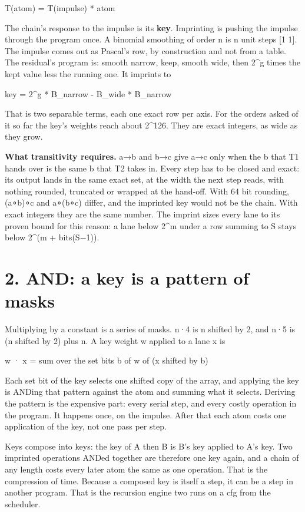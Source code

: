 T(atom) = T(impulse) * atom

The chain's response to the impulse is its \textbf{key}. Imprinting is pushing the impulse through the program once. A binomial smoothing of order n is n unit steps [1 1]. The impulse comes out as Pascal's row, by construction and not from a table. The residual's program is: smooth narrow, keep, smooth wide, then 2\textasciicircum{}g times the kept value less the running one. It imprints to

key = 2\textasciicircum{}g * B\_\allowbreak{}narrow  -  B\_\allowbreak{}wide * B\_\allowbreak{}narrow

That is two separable terms, each one exact row per axis. For the orders asked of it so far the key's weights reach about 2\textasciicircum{}126. They are exact integers, as wide as they grow.

\textbf{What transitivity requires.} a→b and b→c give a→c only when the b that T1 hands over is the same b that T2 takes in. Every step has to be closed and exact: its output lands in the same exact set, at the width the next step reads, with nothing rounded, truncated or wrapped at the hand-off. With 64 bit rounding, (a∘b)∘c and a∘(b∘c) differ, and the imprinted key would not be the chain. With exact integers they are the same number. The imprint sizes every lane to its proven bound for this reason: a lane below 2\textasciicircum{}m under a row summing to S stays below 2\textasciicircum{}(m + bits(S−1)).

\section{\texorpdfstring{2. AND: a key is a pattern of masks}{2. AND: a key is a pattern of masks}}

Multiplying by a constant is a series of masks. n·4 is n shifted by 2, and n·5 is (n shifted by 2) plus n. A key weight w applied to a lane x is

w · x = sum over the set bits b of w of (x shifted by b)

Each set bit of the key selects one shifted copy of the array, and applying the key is ANDing that pattern against the atom and summing what it selects. Deriving the pattern is the expensive part: every serial step, and every costly operation in the program. It happens once, on the impulse. After that each atom costs one application of the key, not one pass per step.

Keys compose into keys: the key of A then B is B's key applied to A's key. Two imprinted operations ANDed together are therefore one key again, and a chain of any length costs every later atom the same as one operation. That is the compression of time. Because a composed key is itself a step, it can be a step in another program. That is the recursion engine two runs on a cfg from the scheduler.

